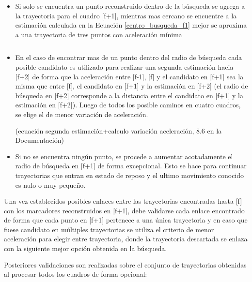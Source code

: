 \begin{itemize}

\item Si solo se encuentra un punto reconstruido dentro de la búsqueda se agrega a la trayectoria para el cuadro [f+1], mientras mas cercano se encuentre a la estimación calculada en la Ecuación \ref{centro_busqueda_f1} mejor se aproxima a una trayectoria de tres puntos con aceleración mínima

\begin{equation}
\label{centro_busqueda_f1}
\end{equation}

\item En el caso de encontrar mas de un punto dentro del radio de búsqueda cada posible candidato es utilizado para realizar una segunda estimación hacia [f+2] de forma que la aceleración entre [f-1], [f] y el candidato en [f+1] sea la misma que entre [f], el candidato en [f+1] y la estimación en [f+2] (el radio de búsqueda en [f+2] corresponde a la distancia entre el candidato en [f+1] y la estimación en [f+2]). Luego de todos los posible caminos en cuatro cuadros, se elige el de menor variación de aceleración.

(ecuación segunda estimación+calculo variación aceleración, 8.6 en la Documentación)

\item Si no se encuentra ningún punto, se procede a aumentar acotadamente el radio de búsqueda en [f+1] de forma excepcional. Esto se hace para continuar trayectorias que entran en estado de reposo y el ultimo movimiento conocido es nulo o muy pequeño.

\end{itemize}

Una vez establecidos posibles enlaces entre las trayectorias encontradas hasta [f] con los marcadores reconstruidos en [f+1], debe validarse cada enlace encontrado de forma que cada punto en [f+1] pertenece a una única trayectoria y en caso que fuese candidato en múltiples trayectorias se utiliza el criterio de menor aceleración para elegir entre trayectoria, donde la trayectoria descartada se enlaza con la siguiente mejor opción obtenida en la búsqueda.

Posteriores validaciones son realizadas sobre el conjunto de trayectorias obtenidas al procesar todos los cuadros de forma opcional: 

